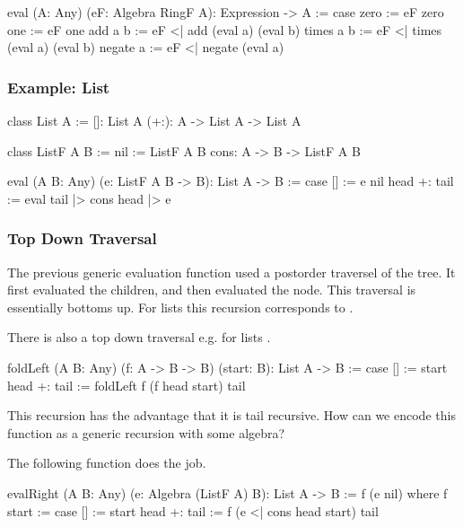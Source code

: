 \begin{alba}
    eval (A: Any) (eF: Algebra RingF A): Expression -> A
    :=
        case
            zero :=
                eF zero
            one :=
                eF one
            add a b :=
                eF <| add (eval a) (eval b)
            times a b :=
                eF <| times (eval a) (eval b)
            negate a :=
                eF <| negate (eval a)
\end{alba}



\subsubsection{Example: List}

\begin{alba}
    class List A :=
        []: List A
        (+:): A -> List A -> List A

    class ListF A B :=
        nil := ListF A B
        cons: A -> B -> ListF A B

    eval (A B: Any) (e: ListF A B -> B): List A -> B
    :=
        case
            [] :=
                e nil
            head +: tail :=
                eval tail |> cons head |> e
\end{alba}




\subsubsection{Top Down Traversal}

The previous generic evaluation function used a postorder traversel of the tree.
It first evaluated the children, and then evaluated the node. This traversal is
essentially bottoms up. For lists this recursion corresponds to
.

There is also a top down traversal e.g. for lists .

\begin{alba}
    foldLeft (A B: Any) (f: A -> B -> B) (start: B): List A -> B
    :=
        case
            [] :=
                start
            head +: tail :=
                foldLeft f (f head start) tail
\end{alba}
%
This recursion has the advantage that it is tail recursive. How can we encode
this function as a generic recursion with some algebra?

The following function does the job.

\begin{alba}
    evalRight (A B: Any) (e: Algebra (ListF A) B): List A -> B
    :=
        f (e nil) where
        f start :=
            case
                [] :=
                    start
                head +: tail :=
                    f (e <| cons head start) tail
\end{alba}

